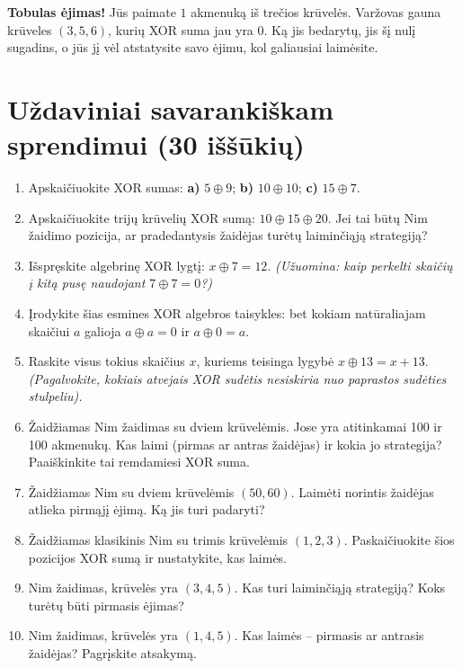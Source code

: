 \documentclass[11pt,a4paper]{scrartcl}
\begin{document}
\textbf{Tobulas ėjimas!} Jūs paimate $1$ akmenuką iš trečios krūvelės. Varžovas gauna krūveles $(3, 5, 6)$, kurių XOR suma jau yra $0$. Ką jis bedarytų, jis šį nulį sugadins, o jūs jį vėl atstatysite savo ėjimu, kol galiausiai laimėsite.
\newpage
\section{Uždaviniai savarankiškam sprendimui (30 iššūkių)}

\begin{enumerate}
    \renewcommand{\labelenumi}{\textbf{\theenumi.}}
    
    \item Apskaičiuokite XOR sumas: \textbf{a)} $5 \oplus 9$; \quad \textbf{b)} $10 \oplus 10$; \quad \textbf{c)} $15 \oplus 7$.
    \item Apskaičiuokite trijų krūvelių XOR sumą: $10 \oplus 15 \oplus 20$. Jei tai būtų Nim žaidimo pozicija, ar pradedantysis žaidėjas turėtų laiminčiąją strategiją?
    \item Išspręskite algebrinę XOR lygtį: $x \oplus 7 = 12$. \textit{(Užuomina: kaip perkelti skaičių į kitą pusę naudojant $7 \oplus 7 = 0$?)}
    \item Įrodykite šias esmines XOR algebros taisykles: bet kokiam natūraliajam skaičiui $a$ galioja $a \oplus a = 0$ ir $a \oplus 0 = a$.
    \item Raskite visus tokius skaičius $x$, kuriems teisinga lygybė $x \oplus 13 = x + 13$. \textit{(Pagalvokite, kokiais atvejais XOR sudėtis nesiskiria nuo paprastos sudėties stulpeliu).}
    
    \item Žaidžiamas Nim žaidimas su dviem krūvelėmis. Jose yra atitinkamai 100 ir 100 akmenukų. Kas laimi (pirmas ar antras žaidėjas) ir kokia jo strategija? Paaiškinkite tai remdamiesi XOR suma.
    \item Žaidžiamas Nim su dviem krūvelėmis $(50, 60)$. Laimėti norintis žaidėjas atlieka pirmąjį ėjimą. Ką jis turi padaryti?
    \item Žaidžiamas klasikinis Nim su trimis krūvelėmis $(1, 2, 3)$. Paskaičiuokite šios pozicijos XOR sumą ir nustatykite, kas laimės.
    \item Nim žaidimas, krūvelės yra $(3, 4, 5)$. Kas turi laiminčiąją strategiją? Koks turėtų būti pirmasis ėjimas?
    \item Nim žaidimas, krūvelės yra $(1, 4, 5)$. Kas laimės – pirmasis ar antrasis žaidėjas? Pagrįskite atsakymą.
    

\end{enumerate}
\end{document}
